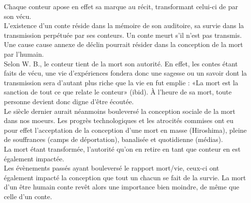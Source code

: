Chaque conteur apose en effet sa marque au récit, transformant celui-ci de par son vécu.\\
L'existence d'un conte réside dans la mémoire de son auditoire, sa survie dans la transmission perpétuée par ses conteurs. Un conte meurt s'il n'est pas transmis.\\
Une cause cause annexe de déclin pourrait résider dans la conception de la mort par l'humain.\\
Selon W. B., le conteur tient de la mort son autorité. En effet, les contes étant faits de vécu, une vie d'expériences fondera donc une sagesse ou un savoir dont la transmission sera d'autant plus riche que la vie en fut emplie :  «La mort est la sanction de tout ce que relate le conteur» (ibid). À l'heure de sa mort, toute personne devient donc digne d'être écoutée.\\

Le siècle dernier aurait néanmoins bouleversé la conception sociale de la mort dans nos moeurs. Les progrès technologiques et les atrocités commises ont eu pour effet l'acceptation de la conception d'une mort en masse (Hiroshima), pleine de souffrances (camps de déportation), banalisée et quotidienne (médias).\\
La mort étant transformée, l'autorité qu'on en retire en tant que conteur en est également impactée.\\
Les évènements passés ayant bouleversé le rapport mort/vie, ceux-ci ont également impacté la conception que tout un chacun se fait de la survie. La mort d'un être humain conte revêt alors une importance bien moindre, de même que celle d'un conte.

\clearpage
